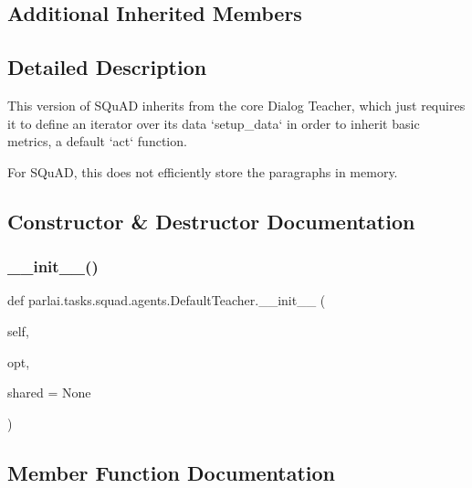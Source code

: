 \subsection*{Additional Inherited Members}


\subsection{Detailed Description}
\begin{DoxyVerb}This version of SQuAD inherits from the core Dialog Teacher, which just requires it
to define an iterator over its data `setup_data` in order to inherit basic metrics,
a default `act` function.

For SQuAD, this does not efficiently store the paragraphs in memory.
\end{DoxyVerb}
 

\subsection{Constructor \& Destructor Documentation}
\mbox{\label{classparlai_1_1tasks_1_1squad_1_1agents_1_1DefaultTeacher_a22833504fb2903d282c7415396bfb3dd}} 
\subsubsection{\texorpdfstring{\+\_\+\+\_\+init\+\_\+\+\_\+()}{\_\_init\_\_()}}
{\footnotesize\ttfamily def parlai.\+tasks.\+squad.\+agents.\+Default\+Teacher.\+\_\+\+\_\+init\+\_\+\+\_\+ (\begin{DoxyParamCaption}\item[{}]{self,  }\item[{}]{opt,  }\item[{}]{shared = {\ttfamily None} }\end{DoxyParamCaption})}



\subsection{Member Function Documentation}
\mbox{\label{classparlai_1_1tasks_1_1squad_1_1agents_1_1DefaultTeacher_a868b9ad003719c4fb50dd3b292007368}} 
